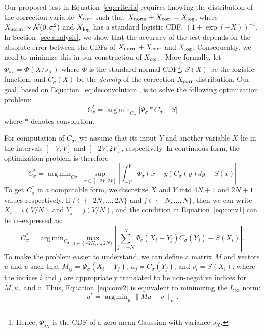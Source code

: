 \documentclass{article}
\DeclareMathOperator*{\argmin}{arg\,min}
\begin{document}
Our proposed test in Equation~\ref{eq:criteria} requires knowing the
distribution of the correction variable $X_{\rm corr}$ such that $X_{\rm norm} +
X_{\rm corr} = X_{\rm log}$, where $X_{\rm norm} \sim \mathcal{N}(0,\sigma^2)$
and $X_{\rm log}$ has a standard logistic CDF, $(1+\exp(-X))^{-1}$. In
Section~\ref{sec:analysis}, we show that the accuracy of the test depends on the
absolute error between the CDFs of $X_{\rm norm} + X_{\rm corr}$ and $X_{\rm
log}$. Consequently, we need to minimize this in our construction of $X_{\rm
corr}$. More formally, let $\Phi_{s_X} = \Phi(X/s_X)$ where $\Phi$ is the
standard normal CDF\footnote{Hence, $\Phi_{s_X}$ is the CDF of a zero-mean
Gaussian with variance $s_X$.}, $S(X)$ be the logistic function, and
$C_{\sigma}(X)$ be the \emph{density} of the correction $X_{\rm corr}$
distribution. Our goal, based on Equation~\ref{eq:deconvolution}, is to solve
the following optimization problem:
\begin{equation}\label{eq:overall_corr_problem}
    C_\sigma^* = \argmin_{C_\sigma} |\Phi_{\sigma} * C_{\sigma} - S|
\end{equation}
where $*$ denotes convolution.

For computation of $C_\sigma$, we assume that its input $Y$ and
another variable $X$ lie in the intervals $[-V,V]$ and $[-2V,2V]$, respectively.
In continuous form, the optimization problem is therefore
\begin{equation}\label{eq:conv1}
    C_\sigma^* = \argmin_{C\sigma} \; \sup_{x \in [-2V,2V]}\left|\int_{-V}^{V}\Phi_{\sigma}(x-y) C_{\sigma}(y)dy - S(x)\right|
\end{equation}
To get $C_\sigma^*$ in a computable form, we discretize $X$ and $Y$ into $4N+1$
and $2N+1$ values respectively. If $i \in \{-2N, \ldots, 2N\}$ and $j \in \{-N,
\ldots, N\}$, then we can write $X_i = i(V/N)$ and $Y_j = j(V/N)$, and the
condition in Equation~\ref{eq:conv1} can be re-expressed as:
\begin{equation}\label{eq:conv2}
    C_\sigma^* = \argmin_{C_\sigma} \max_{i \in \{-2N,\ldots,2N\}}\left|\sum_{j = -N}^{N}\Phi_{\sigma}(X_i-Y_j) C_{\sigma}(Y_j) - S(X_i)\right|.
\end{equation}
To make the problem easier to understand, we can define a matrix $M$ and vectors
$u$ and $v$ such that $M_{ij} = \Phi_{\sigma}(X_i-Y_j)$, $u_j =
C_{\sigma}(Y_j)$, and $v_i = S(X_i)$, where the indices $i$ and $j$ are
appropriately translated to be non-negative indices for $M, u,$ and $v$. Thus,
Equation~\ref{eq:conv2} is equivalent to minimizing the $L_{\infty}$ norm:
\begin{equation}\label{eq:optimization_l1}
    u^* = \argmin_{u} \|Mu-v\|_{\infty}.
\end{equation}
\end{document}
